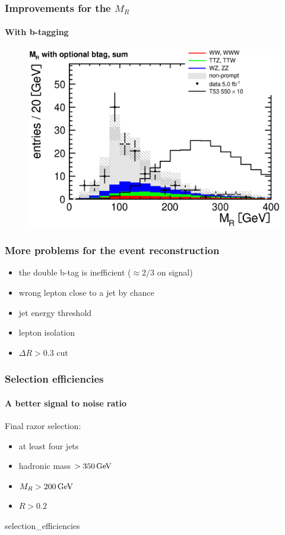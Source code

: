 \documentclass[ukenglish]{beamer}
\begin{document}
\begin{frame}
    \frametitle{Improvements for the $M_R$}
    \framesubtitle{With b-tagging}
        \begin{figure}[h!]
            \centering
                    \includegraphics[height=.8\textheight]{mr_optional_btag_sum.eps}
        \end{figure}
\end{frame}

\begin{frame}
    \frametitle{More problems for the event reconstruction}
    \begin{itemize}
        \item the double b-tag is inefficient ($\approx 2/3$ on signal)
        \item wrong lepton close to a jet by chance
        \item jet energy threshold
        \item lepton isolation
        \item $\Delta R > 0.3$ cut
    \end{itemize}
\end{frame}

\begin{frame}
    \frametitle{Selection efficiencies}
    \framesubtitle{A better signal to noise ratio}
    Final razor selection:
    \begin{itemize}
        \item at least four jets
        \item hadronic mass $>\unit[350]{GeV}$
        \item $M_R > \unit[200]{GeV}$
        \item $R > 0.2$
    \end{itemize}
    {selection_efficiencies}
\end{frame}
\end{document}

